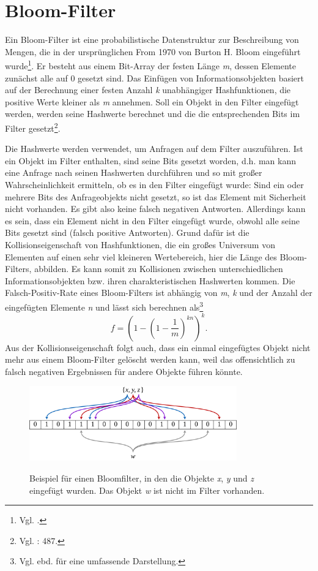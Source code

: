 \section{Bloom-Filter}\label{sec:bloom}
Ein Bloom-Filter ist eine probabilistische Datenstruktur zur Beschreibung von Mengen, die in der ursprünglichen From 1970 von Burton H. Bloom eingeführt wurde\footnote{Vgl. \cite{Bloom1970}.}. Er besteht aus einem Bit-Array der festen Länge \textit{m}, dessen Elemente zunächst alle auf 0 gesetzt sind. Das Einfügen von Informationsobjekten basiert auf der Berechnung einer festen Anzahl \textit{k} unabhängiger Hashfunktionen, die positive Werte kleiner als \textit{m} annehmen. Soll ein Objekt in den Filter eingefügt werden, werden seine Hashwerte berechnet und die die entsprechenden Bits im Filter gesetzt\footnote{Vgl. \cite{Broder2004}: 487.}. 

Die Hashwerte werden verwendet, um Anfragen auf dem Filter auszuführen. Ist ein Objekt im Filter enthalten, sind seine Bits gesetzt worden, d.h. man kann eine Anfrage nach seinen Hashwerten durchführen und so mit großer Wahrscheinlichkeit ermitteln, ob es in den Filter eingefügt wurde: Sind ein oder mehrere Bits des Anfrageobjekts nicht gesetzt, so ist das Element mit Sicherheit nicht vorhanden. Es gibt also keine falsch negativen Antworten. Allerdings kann es sein, dass ein Element nicht in den Filter eingefügt wurde, obwohl alle seine Bits gesetzt sind (falsch positive Antworten). Grund dafür ist die Kollisionseigenschaft von Hashfunktionen, die ein großes Universum von Elementen auf einen sehr viel kleineren Wertebereich, hier die Länge des Bloom-Filters, abbilden. Es kann somit zu Kollisionen zwischen unterschiedlichen Informationsobjekten bzw. ihren charakteristischen Hashwerten kommen. Die Falsch-Positiv-Rate eines Bloom-Filters ist abhängig von \textit{m}, \textit{k} und der Anzahl der eingefügten Elemente \textit{n} und lässt sich berechnen als\footnote{Vgl. ebd. für eine umfassende Darstellung.}
\[f = \left(1 - \left(1-\frac{1}{m}\right)^{kn}\right)^k.\]
Aus der Kollisionseigenschaft folgt auch, dass ein einmal eingefügtes Objekt nicht mehr aus einem Bloom-Filter gelöscht werden kann, weil das offensichtlich zu falsch negativen Ergebnissen für andere Objekte führen könnte. 
\begin{figure}[hpbt]
  \centering
  \includegraphics[width=0.8\textwidth]{pictures/1280px-Bloom_filter.png}\\
  \caption[Bloomfilter-Beispiel (Bildnachweis: \url{https://commons.wikimedia.org/wiki/File:Bloom_filter.svg})]{Beispiel für einen Bloomfilter, in den die Objekte \textit{x}, \textit{y} und \textit{z} eingefügt wurden. Das Objekt \textit{w} ist nicht im Filter vorhanden.}\label{fig:pic0}
\end{figure}
